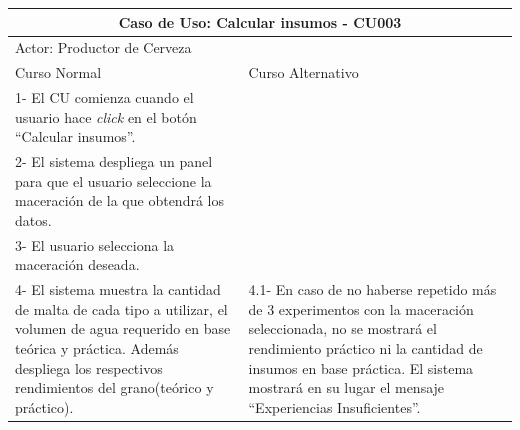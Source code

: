     
    \begin{minipage}{0.95\textwidth}
    \begin{center}
    \begin{tabularx}{\textwidth}{ | X | X |}
        \hline
        \multicolumn{2}{|c|}{\textbf{Caso de Uso: Calcular insumos - CU003}} \\
        \hline
        \multicolumn{2}{|l|}{Actor: Productor de Cerveza} \\
        \hline
        Curso Normal & Curso Alternativo \\
        \hline
        1- El CU comienza cuando el usuario hace \textit{click} en el botón “Calcular insumos”. & \\
        \hline
        2- El sistema despliega un panel para que el usuario seleccione la maceración de la que obtendrá los datos. &  \\
        \hline
        3- El usuario selecciona la maceración deseada. &  \\
        \hline
        4- El sistema muestra la cantidad de malta de cada tipo a utilizar, el volumen de agua requerido en base teórica y práctica. Además despliega los respectivos rendimientos del grano(teórico y práctico). & 4.1- En caso de no haberse repetido más de 3 experimentos con la maceración seleccionada, no se mostrará el rendimiento práctico ni la cantidad de insumos en base práctica. El sistema mostrará en su lugar el mensaje “Experiencias Insuficientes”.  \\
        \hline
        
    \end{tabularx}
    \label{CU003}
    \end{center}
    \end{minipage}
    
